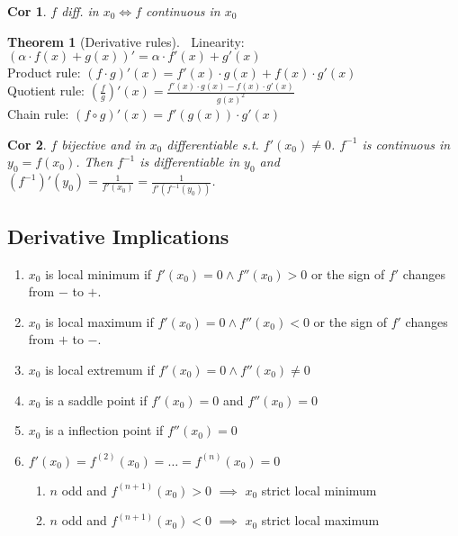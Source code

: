 \documentclass[a4paper, 10pt]{article}
\newtheorem*{corollary}{Cor}
\theoremstyle{definition}
\theoremstyle{named}
\newtheorem*{ntheorem_wrapper}{Theorem}
\newenvironment{ntheorem}%
    {\begin{mdframed}[style=important]\begin{ntheorem_wrapper}}%
    {\end{ntheorem_wrapper}\end{mdframed}}
\begin{document}
\begin{corollary}
    $f$ diff. in $x_0 \iff f$ continuous in $x_0$
\end{corollary}

\begin{ntheorem}[Derivative rules]$\ $ \newline
    Linearity: $(\alpha \cdot f(x) + g(x))' = \alpha \cdot f'(x) + g'(x)$ \\
    Product rule: $(f \cdot g)'(x) = f'(x)\cdot g(x) + f(x)\cdot g'(x)$ \\
    Quotient rule: $\left(\frac{f}{g}\right)'(x) = \frac{f'(x)\cdot g(x) - f(x)\cdot g'(x)}{g(x)^2}$ \\
    Chain rule: $(f \circ g)'(x) = f'(g(x))\cdot g'(x)$
\end{ntheorem}

\begin{corollary}
    $f$ bijective and in $x_0$ differentiable s.t. $f'(x_0) \neq 0$. $f^{-1}$ is continuous in $y_0 = f(x_0)$. Then $f^{-1}$ is differentiable in $y_0$ and $(f^{-1})'(y_0) = \frac{1}{f'(x_0)} = \frac{1}{f'(f^{-1}(y_0))}$. 
\end{corollary}

\subsection{Derivative Implications}
\begin{enumerate}
    \item $x_0$ is local minimum if $f'(x_0) = 0 \land f''(x_0) > 0$ or the sign of $f'$ changes from $-$ to $+$.
    \item $x_0$ is local maximum if $f'(x_0) = 0 \land f''(x_0) < 0$ or the sign of $f'$ changes from $+$ to $-$.
    \item $x_0$ is local extremum if $f'(x_0) = 0 \land f''(x_0) \neq 0$
    \item $x_0$ is a saddle point if $f'(x_0) = 0$ and $f''(x_0) = 0$
    \item $x_0$ is a inflection point if $f''(x_0) = 0$
    \item $f'(x_0) = f^{(2)}(x_0) = \ldots = f^{(n)}(x_0) = 0$
    \begin{enumerate}
        \item $n$ odd and $f^{(n+1)}(x_0) > 0$ $\implies$ $x_0$ strict local minimum
        \item $n$ odd and $f^{(n+1)}(x_0) < 0$ $\implies$ $x_0$ strict local maximum
    \end{enumerate}
\end{enumerate}
\end{document}
